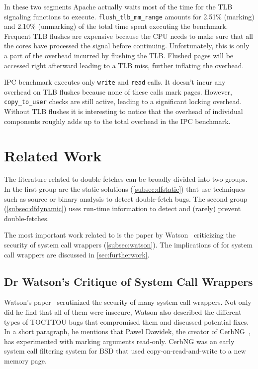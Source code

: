 In these two segments Apache actually waits most of the time for the TLB
signaling functions to execute. \texttt{flush\_tlb\_mm\_range} amounts for
2.51\% (marking) and 2.10\% (unmarking) of the total time spent executing the
benchmark. Frequent TLB flushes are expensive because the CPU needs to make sure
that all the cores have processed the signal before continuing. Unfortunately,
this is only a part of the overhead incurred by flushing the TLB. Flushed pages
will be accessed right afterward leading to a TLB miss, further inflating the
overhead.

IPC benchmark executes only \texttt{write} and \texttt{read} calls. It doesn't
incur any overhead on TLB flushes because none of these calls mark pages.
However, \texttt{copy\_to\_user} checks are still
active, leading to a significant locking overhead. Without TLB flushes it is
interesting to notice that the overhead of individual components roughly adds
up to the total overhead in the IPC benchmark.


\section{Related Work}
\label{sec:relatedwork}

The literature related to double-fetches can be broadly divided into two groups.
In the first group are the static solutions (\autoref{subsec:dfstatic}) that use
techniques such as source or binary analysis to detect double-fetch bugs. The
second group (\autoref{subsec:dfdynamic}) uses run-time information to detect
and (rarely) prevent double-fetches.

The most important work related to \sysname is the paper by
Watson~\cite{watson2007exploiting} criticizing the security of system call
wrappers (\autoref{subsec:watson}). The implications of \sysname for system call
wrappers are discussed in \autoref{sec:furtherwork}.

\subsection{Dr Watson's Critique of System Call Wrappers}
\label{subsec:watson}
Watson's paper~\cite{watson2007exploiting} scrutinized the security of many
system call wrappers. Not only did he find that all of them were insecure,
Watson also described the different types of TOCTTOU bugs that compromised them
and discussed potential fixes. In a short paragraph, he mentions that Pawel
Dawidek, the creator of CerbNG~\cite{zak_frasunek_dawidek}, has experimented
with marking arguments read-only. CerbNG was an early system call filtering
system for BSD that used copy-on-read-and-write to a new memory page.

